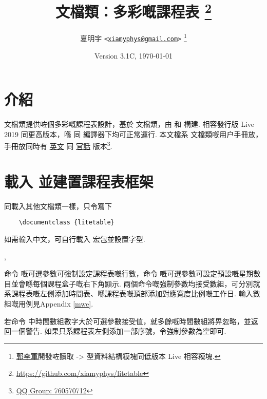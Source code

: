 \documentclass[letterpaper]{l3doc}
\title
{
  \bfseries\cls{litetable} 文檔類：多彩嘅課程表
  \footnote{\url{https://github.com/xiamyphys/litetable}}
}
\author
{
  夏明宇 \texttt{<\href{mailto:xiamyphys@gmail.com}{xiamyphys@gmail.com}>}
  \thanks{\href{https://github.com/ljguo1020}{郭李軍}開發咗讀取 \meta{left} -> \meta{right} 型資料結構糢塊同低版本 \hologo{TeX} Live 相容糢塊.}
}
\date{Version 3.1C, \today}
\begin{document}
\maketitle

\section{介紹}

 文檔類提供咗個多彩嘅課程表設計，基於  文檔類，由  和  構建. 相容發行版  Live 2019 同更高版本，喺  同  編譯器下均可正常運行. 本文檔系  文檔類嘅用户手冊放，手冊放同時有 \href{./litetable-en.pdf}{英文} 同 \href{./litetable-cn.pdf}{官話} 版本\footnote{\href{https://qm.qq.com/q/RyssAhG4qy}{QQ Group: 760570712}}.

\section{載入  並建置課程表框架}

同載入其他文檔類一樣，只令寫下

\begin{framed}
  \begin{verbatim}
    \documentclass {litetable}
  \end{verbatim}
\end{framed}

如需輸入中文，可自行載入  宏包並設置字型.

\begin{function}{\timelist,\weeklist}
  \begin{syntax}
                  
         
  \end{syntax}

  命令  嘅可選參數可強制設定課程表嘅行數，命令  嘅可選參數可設定預設嘅星期數目並會喺每個課程盒子嘅右下角顯示. 兩個命令嘅強制參數均接受數組，可分別就系課程表嘅左側添加時間表、喺課程表嘅頂部添加對應寬度比例嘅工作日. 輸入數組嘅用例見Appendix \ref{mwe}.
  
  若命令  中時間數組數字大於可選參數接受值，就多餘嘅時間數組將畀忽略，並返回一個警告. 如果只系課程表左側添加一部序號，令強制參數為空即可.
\end{function}
\end{document}
